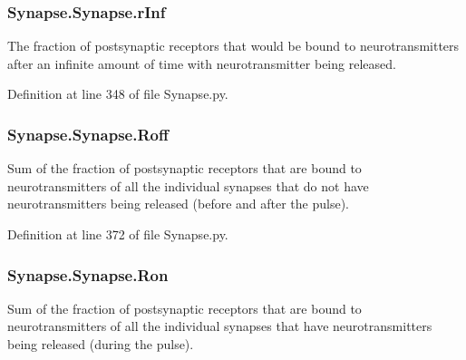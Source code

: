 \subsubsection[{\texorpdfstring{r\+Inf}{rInf}}]{\setlength{\rightskip}{0pt plus 5cm}Synapse.\+Synapse.\+r\+Inf}\hypertarget{class_synapse_1_1_synapse_afd263d49a97910efd8955a2aadef50e0}{}\label{class_synapse_1_1_synapse_afd263d49a97910efd8955a2aadef50e0}


The fraction of postsynaptic receptors that would be bound to neurotransmitters after an infinite amount of time with neurotransmitter being released. 



Definition at line 348 of file Synapse.\+py.

\subsubsection[{\texorpdfstring{Roff}{Roff}}]{\setlength{\rightskip}{0pt plus 5cm}Synapse.\+Synapse.\+Roff}\hypertarget{class_synapse_1_1_synapse_ae67ffbbd23cd9c56f20bda9e8e040663}{}\label{class_synapse_1_1_synapse_ae67ffbbd23cd9c56f20bda9e8e040663}


Sum of the fraction of postsynaptic receptors that are bound to neurotransmitters of all the individual synapses that do not have neurotransmitters being released (before and after the pulse). 



Definition at line 372 of file Synapse.\+py.

\subsubsection[{\texorpdfstring{Ron}{Ron}}]{\setlength{\rightskip}{0pt plus 5cm}Synapse.\+Synapse.\+Ron}\hypertarget{class_synapse_1_1_synapse_ae759c51a7196995510fe3eb086050c76}{}\label{class_synapse_1_1_synapse_ae759c51a7196995510fe3eb086050c76}


Sum of the fraction of postsynaptic receptors that are bound to neurotransmitters of all the individual synapses that have neurotransmitters being released (during the pulse). 



